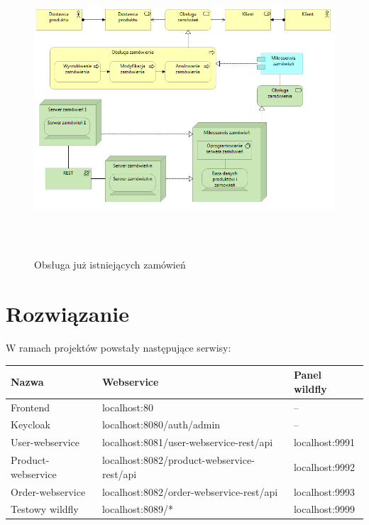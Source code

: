 \documentclass[11pt,a4paper,twoside]{article}
\begin{document}
\begin{figure}[ht]
\caption{Obsługa już istniejących zamówień}
\label{obslugaZamowienia04}
\centering
\includegraphics[height=11cm, width=15.7cm]{04_zamowienie_obsluga}
\end{figure}

\clearpage
\section{Rozwiązanie}
W ramach projektów powstały następujące serwisy:

\begin{table}[ht]
\label{spisSerwisow}
\centering
\begin{tabular}{|l|l|l|}
\hline
 Nazwa & Webservice & Panel wildfly \\\hline
 Frontend & localhost:80 & -- \\\hline
 Keycloak & localhost:8080/auth/admin & -- \\\hline
 User-webservice & localhost:8081/user-webservice-rest/api & localhost:9991 \\\hline
 Product-webservice & localhost:8082/product-webservice-rest/api & localhost:9992 \\\hline
 Order-webservice & localhost:8082/order-webservice-rest/api & localhost:9993\\\hline
 Testowy wildfly & localhost:8089/* & localhost:9999 \\\hline
\end{tabular}
\end{table}
\end{document}
